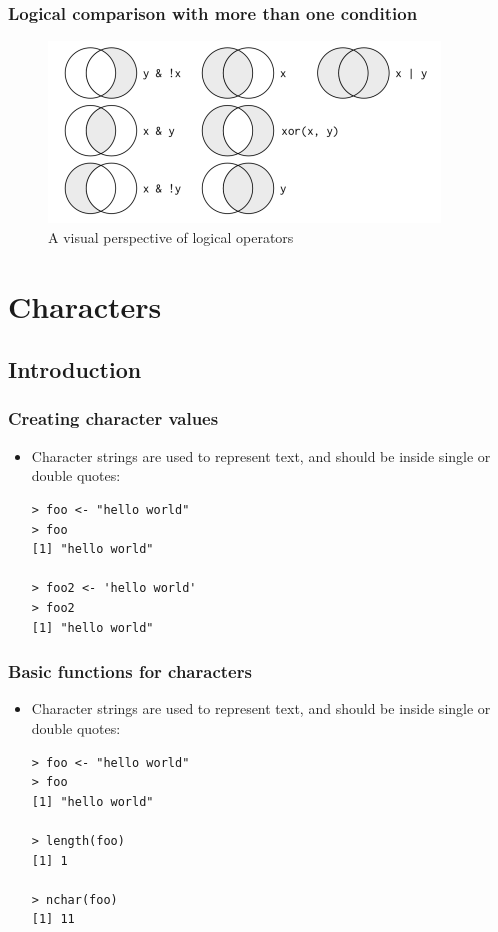 \documentclass[xcolor=dvipsnames, xcolor=table]{beamer} %
\theoremstyle{mystyle}
\begin{document}
\begin{frame}[fragile] %
\frametitle{Logical comparison with more than one condition}

\begin{figure}
\includegraphics[scale=.8]{logical.png}
\caption{A visual perspective of logical operators}
\end{figure}

\end{frame}

\section{Characters}

\subsection{Introduction}

\begin{frame}[fragile] %
\frametitle{Creating character values}

\begin{itemize}
\item Character strings are used to represent text, and should be inside single or double quotes:

\begin{verbatim}
> foo <- "hello world"
> foo
[1] "hello world"

> foo2 <- 'hello world'
> foo2
[1] "hello world"

\end{verbatim}
\end{itemize}
\end{frame}

\begin{frame}[fragile] %
\frametitle{Basic functions for characters}

\begin{itemize}
\item Character strings are used to represent text, and should be inside single or double quotes:

\begin{verbatim}
> foo <- "hello world"
> foo
[1] "hello world"

> length(foo)
[1] 1

> nchar(foo)
[1] 11
\end{verbatim}
\end{itemize}
\end{frame}
\end{document}
